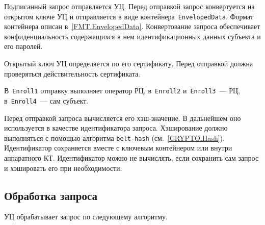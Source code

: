 Подписанный запрос отправляется УЦ. Перед отправкой запрос конвертуется на 
открытом ключе УЦ и отправляется в виде контейнера~\texttt{EnvelopedData}. 
Формат контейнера описан в~\ref{FMT.EnvelopedData}. 
Конвертование запроса обеспечивает конфиденциальность содержащихся в нем 
идентификационных данных субъекта и его паролей.  

Открытый ключ УЦ определяется по его сертификату. Перед отправкой 
должна проверяться действительность сертификата.

В~\texttt{Enroll1} отправку выполняет оператор РЦ,
в~\texttt{Enroll2} и~\texttt{Enroll3}~--- РЦ,
в~\texttt{Enroll4}~--- сам субъект.

Перед отправкой запроса вычисляется его хэш-значение. 
В дальнейшем оно используется в качестве идентификатора запроса. 
Хэширование должно выполняться с помощью алгоритма 
\texttt{belt-hash} (см.~\ref{CRYPTO.Hash}).
%
Идентификатор сохраняется вместе с ключевым контейнером или внутри 
аппаратного КТ.
%
Идентификатор можно не вычислять, если сохранить сам запрос и хэшировать 
его при необходимости.

\subsection{Обработка запроса}\label{PROCESSES.Enroll.Issue}

УЦ обрабатывает запрос по следующему алгоритму.

